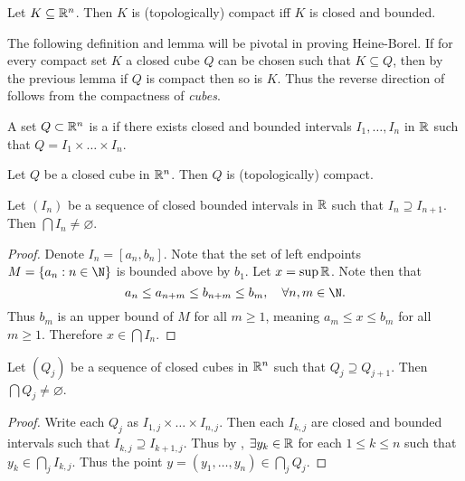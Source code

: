 \documentclass[../main.tex]{subfiles}
\begin{document}
\begin{theorem}
    \label{thm:heineborel}
    Let $K \subseteq \mathbb{R}^n$. Then $K$ is (topologically) compact iff $K$ is closed and bounded.
\end{theorem}

The following definition and lemma will be pivotal in proving Heine-Borel. If for every compact set $K$ a closed cube $Q$ can be chosen such that $K \subseteq Q$, then by the previous lemma if $Q$ is compact then so is $K$. Thus the reverse direction of  follows from the compactness of \emph{cubes}.

\begin{definition}
    A set $Q \subset \mathbb{R}^n$ is a  if there exists closed and bounded intervals $I_1, \ldots, I_n$ in $\mathbb{R}$ such that $Q = I_1 \times \ldots \times I_n$.
\end{definition}

\begin{lemma}
    \label{lemma:cubescompact}
    Let $Q$ be a closed cube in $\mathbb{R}^n$. Then $Q$ is (topologically) compact.
\end{lemma}

\begin{lemma}
    \label{lemma:dec_bounded_intervals}
    Let $(I_n)$ be a sequence of closed bounded intervals in $\mathbb{R}$ such that $I_{n} \supseteq I_{n+1}$. Then $\bigcap I_n \neq \varnothing$.
\end{lemma}

\begin{proof}
    Denote $I_n = [a_n, b_n]$. Note that the set of left endpoints $M = \qty{a_n : n \in \N}$ is bounded above by $b_1$. Let $x = \sup \mathbb{R}$. Note then that
    \[
        a_n \leq a_{n + m} \leq b_{n + m} \leq b_m, \quad \forall n,m \in \N
    .\]
    Thus $b_m$ is an upper bound of $M$ for all $m \geq 1$, meaning $a_m \leq x \leq b_m$ for all $m \geq 1$. Therefore $x \in \bigcap I_n$.
\end{proof}

\begin{lemma}
    \label{lemma:dec_closed_cubes}
    Let $(Q_j)$ be a sequence of closed cubes in $\mathbb{R}^n$ such that $Q_j \supseteq Q_{j+1}$. Then $\bigcap Q_j \neq \varnothing$.
\end{lemma}

\begin{proof}
    Write each $Q_j$ as $I_{1,j} \times \ldots \times I_{n,j}$. Then each $I_{k,j}$ are closed and bounded intervals such that $I_{k,j} \supseteq I_{k+1, j}$. Thus by , $\exists y_k \in \mathbb{R}$ for each $1 \leq k \leq n$ such that $y_k \in \bigcap_{j} I_{k,j}$. Thus the point $y = (y_1, \ldots, y_n) \in \bigcap_{j} Q_j$.
\end{proof}
\end{document}

